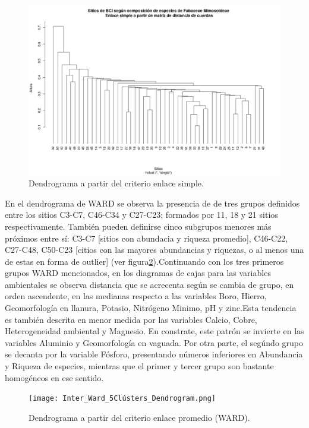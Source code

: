 \documentclass[11pt,]{article}
\begin{document}
\begin{figure}
\centering
\includegraphics[width=1.00000\textwidth]{DenSimple.png}
\caption{Dendrograma a partir del criterio enlace
simple.\label{fig:denS}}
\end{figure}

En el dendrograma de WARD se observa la presencia de de tres grupos
definidos entre los sitios C3-C7, C46-C34 y C27-C23; formados por 11, 18
y 21 sitios respectivamente. También pueden definirse cinco subgrupos
menores más próximos entre sí: C3-C7 {[}sitios con abundacia y riqueza
promedio{]}, C46-C22, C27-C48, C50-C23 {[}citios con las mayores
abundancias y riquezas, o al menos una de estas en forma de outlier{]}
(ver figura\ref{fig:denW}).Continuando con los tres primeros grupos WARD
mencionados, en los diagramas de cajas para las variables ambientales se
observa distancia que se acrecenta según se cambia de grupo, en orden
ascendente, en las medianas respecto a las variables Boro, Hierro,
Geomorfología en llanura, Potasio, Nitrógeno Minimo, pH y zinc.Esta
tendencia es también descrita en menor medida por las variables Calcio,
Cobre, Heterogeneidad ambiental y Magnesio. En constrate, este patrón se
invierte en las variables Aluminio y Geomorfología en vaguada. Por otra
parte, el segúndo grupo se decanta por la variable Fósforo, presentando
números inferiores en Abundancia y Riqueza de especies, mientras que el
primer y tercer grupo son bastante homogéneos en ese sentido.

\begin{figure}
\centering
\texttt{[image: Inter\_Ward\_5Clústers\_Dendrogram.png]}
\caption{Dendrograma a partir del criterio enlace promedio
(WARD).\label{fig:denW}}
\end{figure}
\end{document}
